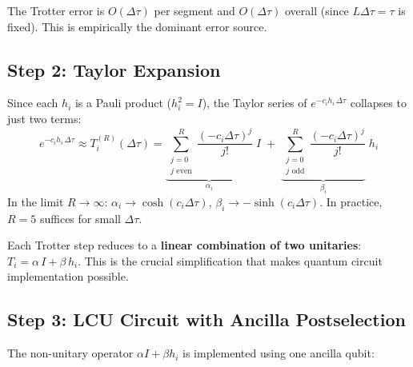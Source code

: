 \documentclass[11pt,a4paper]{article}
\begin{document}
The Trotter error is $O(\Delta\tau)$ per segment and $O(\Delta\tau)$ overall (since $L\Delta\tau = \tau$ is fixed).  This is empirically the dominant error source.

\subsection{Step 2: Taylor Expansion}

Since each $h_i$ is a Pauli product ($h_i^2 = I$), the Taylor series of
$e^{-c_i h_i\,\Delta\tau}$ collapses to just two terms:
\begin{equation}
  e^{-c_i h_i\,\Delta\tau}
  \approx T_i^{(R)}(\Delta\tau)
  = \underbrace{\sum_{\substack{j=0\\j\text{ even}}}^{R}
    \frac{(-c_i\Delta\tau)^j}{j!}}_{\alpha_i}\;I
  \;+\; \underbrace{\sum_{\substack{j=0\\j\text{ odd}}}^{R}
    \frac{(-c_i\Delta\tau)^j}{j!}}_{\beta_i}\;h_i
  \label{eq:taylor}
\end{equation}
In the limit $R \to \infty$: $\alpha_i \to \cosh(c_i\Delta\tau)$, $\beta_i \to -\sinh(c_i\Delta\tau)$.  In practice, $R = 5$ suffices for small $\Delta\tau$.

\begin{keybox}
Each Trotter step reduces to a \textbf{linear combination of two unitaries}:
$T_i = \alpha\,I + \beta\,h_i$.  This is the crucial simplification that
makes quantum circuit implementation possible.
\end{keybox}

\subsection{Step 3: LCU Circuit with Ancilla Postselection}

The non-unitary operator $\alpha I + \beta h_i$ is implemented using one
ancilla qubit:
\end{document}
